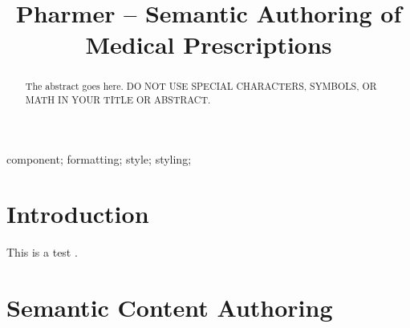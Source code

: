 \documentclass[10pt, conference, compsocconf]{IEEEtran}
\begin{document}
\title{Pharmer -- Semantic Authoring of Medical Prescriptions}



\author{
\and
{}
}


\maketitle

\begin{abstract}
The abstract goes here. DO NOT USE SPECIAL CHARACTERS, SYMBOLS, OR MATH IN YOUR TITLE OR ABSTRACT.

\end{abstract}

\begin{IEEEkeywords}
component; formatting; style; styling;

\end{IEEEkeywords}


\IEEEpeerreviewmaketitle



\section{Introduction}
This is a test \cite{Khalili2012}.

\section{Semantic Content Authoring}
\label{sec:sca}
\end{document}

